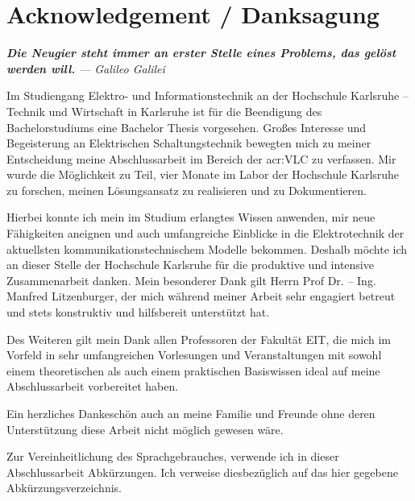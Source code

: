 \chapter*{Acknowledgement / Danksagung}

\textit{\textbf{Die Neugier steht immer an erster Stelle eines Problems, das gelöst
		werden will.}}
\textit{— Galileo Galilei}


Im Studiengang Elektro- und Informationstechnik an der Hochschule Karlsruhe – Technik und Wirtschaft in Karlsruhe ist für die Beendigung des Bachelorstudiums eine Bachelor Thesis vorgesehen. Großes Interesse und Begeisterung an Elektrischen Schaltungstechnik bewegten mich zu meiner Entscheidung meine Abschlussarbeit im Bereich der \gls{acr:VLC} zu verfassen. Mir wurde die Möglichkeit zu Teil, vier Monate im Labor der Hochschule Karlsruhe zu forschen, meinen Lösungsansatz zu realisieren und zu Dokumentieren.

Hierbei konnte ich mein im Studium erlangtes Wissen anwenden, mir neue Fähigkeiten aneignen und auch umfangreiche Einblicke in die Elektrotechnik der aktuellsten kommunikationstechnischem Modelle bekommen. Deshalb möchte ich an dieser Stelle der Hochschule Karlsruhe für die produktive und intensive Zusammenarbeit danken. Mein besonderer Dank gilt Herrn Prof Dr. – Ing. Manfred Litzenburger, der mich während meiner Arbeit sehr engagiert betreut und stets konstruktiv und hilfsbereit unterstützt hat.

Des Weiteren gilt mein Dank allen Professoren der Fakultät EIT, die mich im Vorfeld in sehr umfangreichen Vorlesungen und Veranstaltungen mit sowohl einem theoretischen als auch einem praktischen Basiswissen ideal auf meine Abschlussarbeit vorbereitet haben.

Ein herzliches Dankeschön auch an meine Familie und Freunde ohne deren Unterstützung
diese Arbeit nicht möglich gewesen wäre.

Zur Vereinheitlichung des Sprachgebrauches, verwende ich in dieser Abschlussarbeit Abkürzungen. Ich verweise diesbezüglich auf das hier gegebene Abkürzungsverzeichnis.
